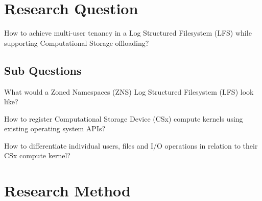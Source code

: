 \section{Research Question}

How to achieve multi-user tenancy in a Log Structured Filesystem (LFS) while
supporting Computational Storage offloading?

\subsection{Sub Questions}

What would a Zoned Namespaces (ZNS) Log Structured Filesystem (LFS) look like?

How to register Computational Storage Device (CSx) compute kernels using
existing operating system APIs?

How to differentiate individual users, files and I/O operations in relation to
their CSx compute kernel?

\section{Research Method}

